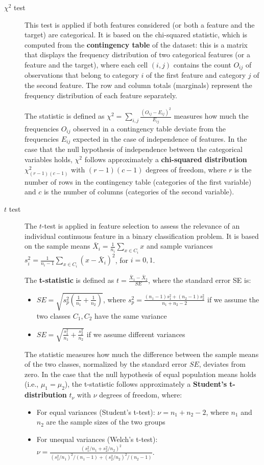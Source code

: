 \begin{description}
\item[$\chi^2$ test] This test is applied if both features considered (or both a feature and the target) are categorical. It is based on the
\alert{chi-squared statistic}, which is computed from the \textbf{contingency table} of the dataset: this is a matrix that displays the frequency distribution of two categorical features (or a feature and the target), where each cell $(i,j)$ contains the count $O_{ij}$ of observations that belong to category $i$ of the first feature and category $j$ of the second feature. The row and column totals (marginals) represent the frequency distribution of each feature separately.

The statistic is defined as $\chi^2 = \sum_{i,j} \frac{(O_{ij} - E_{ij})^2}{E_{ij}}$ measures how much the frequencies $O_{ij}$ observed in a contingency table deviate from the  frequencies $E_{ij}$ expected in the case of independence of features.
In the case that the null hypothesis of independence between the categorical variables holds, $\chi^2$ follows approximately a \textbf{chi-squared distribution} $ \chi^2_{(r-1)(c-1)}$ with $(r-1)(c-1)$ degrees of freedom, where $r$ is the number of rows in the contingency table (categories of the first variable) and $c$ is the number of columns (categories of the second variable).

\item[$t$ test] The $t$-test is applied in feature selection to assess the relevance of an individual continuous feature in a binary classification problem. 
It is based on the sample means $\bar{X}_i=\frac{1}{n_i}\sum_{x\in C_i}x$ and sample variances   $s_i^2 = \frac{1}{n_i-1}\sum_{x\in C_i}(x - \bar{X}_i)^2$, for $i=0,1$.

The \textbf{t-statistic} is defined as $t = \frac{\bar{X}_1 - \bar{X}_2}{SE}$, where the \alert{standard error} SE is:
\begin{itemize}
\item $SE = \sqrt{s_p^2 \left(\frac{1}{n_1} + \frac{1}{n_2}\right)}$, where $s_p^2 = \frac{(n_1-1)s_1^2 + (n_2-1)s_2^2}{n_1+n_2-2}$ if we assume the two classes $C_1, C_2$ have the same variance
\item $SE = \sqrt{\frac{s_1^2}{n_1} + \frac{s_2^2}{n_2}}$ if we assume  different variances
\end{itemize}

The statistic measures how much the difference between the sample means of the two classes, normalized by the standard error $SE$, deviates from zero. In the case that the null hypothesis of equal population means holds (i.e., $\mu_1 = \mu_2$), the t-statistic follows approximately a \textbf{Student's t-distribution} $t_{\nu}$ with $\nu$ degrees of freedom, where:
\begin{itemize}
\item For equal variances (Student's t-test): $\nu = n_1 + n_2 - 2$, where $n_1$ and $n_2$ are the sample sizes of the two groups
\item For unequal variances (Welch's t-test): $\nu = \frac{(s_1^2/n_1 + s_2^2/n_2)^2}{(s_1^2/n_1)^2/(n_1-1) + (s_2^2/n_2)^2/(n_2-1)}$.
\end{itemize}


\end{description}
